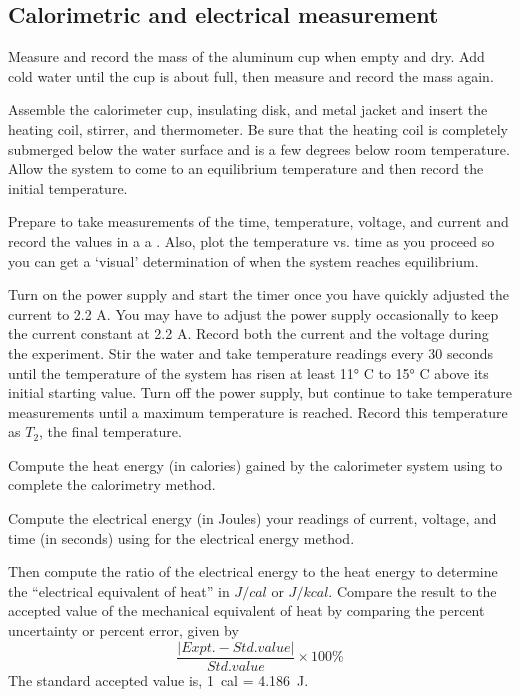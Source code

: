 \begin{multicols}{2}
\subsection{Calorimetric and electrical measurement}

Measure and record the mass of the aluminum cup when empty and dry.
Add cold water until the cup is about  full, then measure and record the mass again.

Assemble the calorimeter cup, insulating disk, and metal jacket and insert the heating coil, stirrer, and thermometer.  Be sure that the heating coil is completely submerged below the water surface and is a few degrees below room temperature. Allow the system to come to an equilibrium temperature and then record the initial temperature.

Prepare to take measurements of the time, temperature, voltage, and current and record the values in a a 
. Also, plot the temperature vs. time as you proceed so you can get a `visual' determination of when the system reaches equilibrium.

Turn on the power supply and start the timer once you have quickly adjusted the current to 2.2 A.  You may have to adjust the power supply occasionally to keep the current constant at 2.2 A.  Record both the current and the voltage during the experiment.  Stir the water and take temperature readings every 30 seconds until the temperature of the system has risen at least \ang{11} C to \ang{15} C above its initial starting value.  Turn off the power supply, but continue to take temperature measurements %
until a maximum temperature is reached. Record this temperature as $T_2$, the final temperature.

Compute the heat energy (in calories) gained by the calorimeter system using  to complete the calorimetry method. %

Compute the electrical energy (in Joules) your readings of current, voltage, and time (in seconds) using   for the electrical energy  method.

Then compute the ratio of the electrical energy to the heat energy to determine the ``electrical equivalent of heat'' in $J/cal$ or $J/kcal$. Compare the result to the accepted value of the mechanical equivalent of heat by comparing the percent uncertainty or percent error, given by
\[ \frac{|Expt. - Std. value|}{Std. value} \times 100\% \]
 The standard accepted value is, 1~cal = 4.186~J.

\end{multicols}
